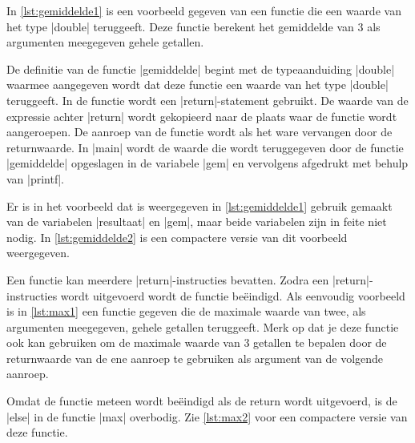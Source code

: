 In \cref{lst:gemiddelde1} is een voorbeeld gegeven van een functie die een waarde van het type |double| teruggeeft.
Deze functie berekent het gemiddelde van 3 als argumenten meegegeven gehele getallen.
  

De definitie van de functie |gemiddelde| begint met de typeaanduiding |double| waarmee aangegeven wordt dat deze functie een waarde van het type |double| teruggeeft.
In de functie wordt een |return|-statement gebruikt.
De waarde van de expressie achter |return| wordt gekopieerd naar de plaats waar de functie wordt aangeroepen.
De aanroep van de functie wordt als het ware vervangen door de returnwaarde.
In |main| wordt de waarde die wordt teruggegeven door de functie |gemiddelde| opgeslagen in de variabele |gem| en vervolgens afgedrukt met behulp van |printf|.

Er is in het voorbeeld dat is weergegeven in \cref{lst:gemiddelde1} gebruik gemaakt van de variabelen |resultaat| en |gem|, maar beide variabelen zijn in feite niet nodig.
In  \cref{lst:gemiddelde2} is een compactere versie van dit voorbeeld weergegeven.


Een functie kan meerdere |return|-instructies bevatten. 
Zodra een |return|-in\-struc\-ties wordt uitgevoerd wordt de functie beëindigd.
Als eenvoudig voorbeeld is in \cref{lst:max1} een functie gegeven die de maximale waarde van twee, als argumenten meegegeven, gehele getallen teruggeeft.
Merk op dat je deze functie ook kan gebruiken om de maximale waarde van 3 getallen te bepalen door de returnwaarde van de ene aanroep te gebruiken als argument van de volgende aanroep.


Omdat de functie meteen wordt beëindigd als de return wordt uitgevoerd, is de |else| in de functie |max| overbodig. Zie \cref{lst:max2} voor een compactere versie van deze functie.



